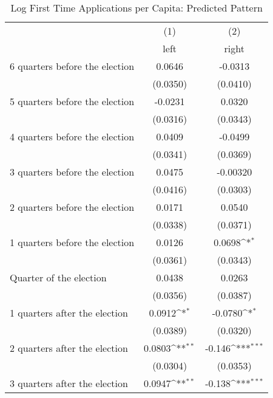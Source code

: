 \begin{table}[htbp]\centering
\def\sym#1{\ifmmode^{#1}\else\(^{#1}\)\fi}
\caption{Log First Time Applications per Capita: Predicted Pattern}
\begin{tabular}{l*{2}{c}}
\hline\hline
                    &\multicolumn{1}{c}{(1)}&\multicolumn{1}{c}{(2)}\\
                    &\multicolumn{1}{c}{left}&\multicolumn{1}{c}{right}\\
\hline
 6 quarters before the election&      0.0646         &     -0.0313         \\
                    &    (0.0350)         &    (0.0410)         \\
[1em]
 5 quarters before the election&     -0.0231         &      0.0320         \\
                    &    (0.0316)         &    (0.0343)         \\
[1em]
 4 quarters before the election&      0.0409         &     -0.0499         \\
                    &    (0.0341)         &    (0.0369)         \\
[1em]
 3 quarters before the election&      0.0475         &    -0.00320         \\
                    &    (0.0416)         &    (0.0303)         \\
[1em]
 2 quarters before the election&      0.0171         &      0.0540         \\
                    &    (0.0338)         &    (0.0371)         \\
[1em]
 1 quarters before the election&      0.0126         &      0.0698\sym{*}  \\
                    &    (0.0361)         &    (0.0343)         \\
[1em]
Quarter of the election&      0.0438         &      0.0263         \\
                    &    (0.0356)         &    (0.0387)         \\
[1em]
 1 quarters after the election&      0.0912\sym{*}  &     -0.0780\sym{*}  \\
                    &    (0.0389)         &    (0.0320)         \\
[1em]
 2 quarters after the election&      0.0803\sym{**} &      -0.146\sym{***}\\
                    &    (0.0304)         &    (0.0353)         \\
[1em]
 3 quarters after the election&      0.0947\sym{**} &      -0.138\sym{***}\\

\end{tabular}
\end{table}
